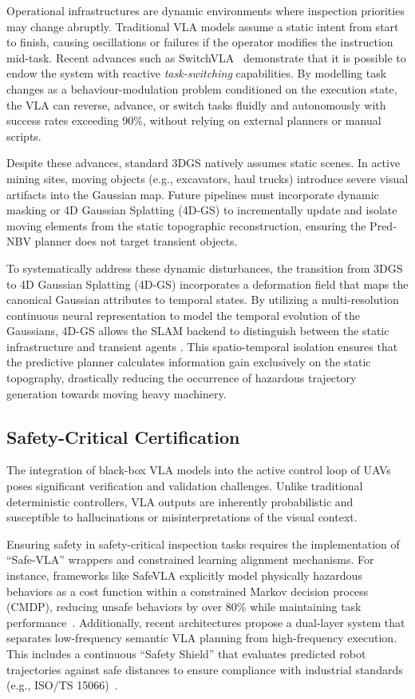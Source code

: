 \documentclass[conference]{IEEEtran}
\begin{document}
Operational infrastructures are dynamic environments where inspection priorities may change abruptly.
Traditional VLA models assume a static intent from start to finish, causing oscillations or failures if the operator modifies the instruction mid-task.
Recent advances such as SwitchVLA~\cite{li2025switchvla} demonstrate that it is possible to endow the system with reactive \emph{task-switching} capabilities.
By modelling task changes as a behaviour-modulation problem conditioned on the execution state, the VLA can reverse, advance, or switch tasks fluidly and autonomously with success rates exceeding 90\%, without relying on external planners or manual scripts.

Despite these advances, standard 3DGS natively assumes static scenes. In active mining sites, moving objects (e.g., excavators, haul trucks) introduce severe visual artifacts into the Gaussian map. Future pipelines must incorporate dynamic masking or 4D Gaussian Splatting (4D-GS) to incrementally update and isolate moving elements from the static topographic reconstruction, ensuring the Pred-NBV planner does not target transient objects.

To systematically address these dynamic disturbances, the transition from 3DGS to 4D Gaussian Splatting (4D-GS) incorporates a deformation field that maps the canonical Gaussian attributes to temporal states. By utilizing a multi-resolution continuous neural representation to model the temporal evolution of the Gaussians, 4D-GS allows the SLAM backend to distinguish between the static infrastructure and transient agents \cite{11321396}. This spatio-temporal isolation ensures that the predictive planner calculates information gain exclusively on the static topography, drastically reducing the occurrence of hazardous trajectory generation towards moving heavy machinery.

\subsection{Safety-Critical Certification}
\label{subsec:disc_safety}

The integration of black-box VLA models into the active control loop of UAVs poses significant verification and validation challenges. Unlike traditional deterministic controllers, VLA outputs are inherently probabilistic and susceptible to hallucinations or misinterpretations of the visual context.

Ensuring safety in safety-critical inspection tasks requires the implementation of ``Safe-VLA'' wrappers and constrained learning alignment mechanisms. For instance, frameworks like SafeVLA explicitly model physically hazardous behaviors as a cost function within a constrained Markov decision process (CMDP), reducing unsafe behaviors by over 80\% while maintaining task performance~\cite{zhang2025safevla}. Additionally, recent architectures propose a dual-layer system that separates low-frequency semantic VLA planning from high-frequency execution. This includes a continuous ``Safety Shield'' that evaluates predicted robot trajectories against safe distances to ensure compliance with industrial standards (e.g., ISO/TS 15066)~\cite{mohrle2025concept}. 
\end{document}
